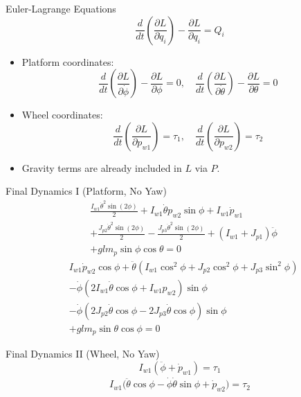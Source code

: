 \begin{frame}{Euler-Lagrange Equations}
    \small
    \[
    \frac{d}{dt}\left(\frac{\partial L}{\partial \dot q_i}\right)-\frac{\partial L}{\partial q_i}=Q_i
    \]
    \begin{itemize}
        \item Platform coordinates:
        \[
        \frac{d}{dt}\left(\frac{\partial L}{\partial \dot\phi}\right)-\frac{\partial L}{\partial \phi}=0,\quad
        \frac{d}{dt}\left(\frac{\partial L}{\partial \dot\theta}\right)-\frac{\partial L}{\partial \theta}=0
        \]
        \item Wheel coordinates:
        \[
        \frac{d}{dt}\left(\frac{\partial L}{\partial p_{w1}}\right)=\tau_1,\quad
        \frac{d}{dt}\left(\frac{\partial L}{\partial p_{w2}}\right)=\tau_2
        \]
        \item Gravity terms are already included in $L$ via $P$.
    \end{itemize}
\end{frame}

\begin{frame}{Final Dynamics I (Platform, No Yaw)}
    \footnotesize
    \[
    \begin{aligned}
    &\frac{I_{w1}\dot{\theta}^{2}\sin(2\phi)}{2}
    +I_{w1}\dot{\theta}p_{w2}\sin\phi
    +I_{w1}\dot p_{w1}\\
    &+\frac{J_{p2}\dot{\theta}^{2}\sin(2\phi)}{2}
    -\frac{J_{p3}\dot{\theta}^{2}\sin(2\phi)}{2}
    +(I_{w1}+J_{p1})\ddot\phi\\
    &+glm_p\sin\phi\cos\theta=0
    \end{aligned}
    \]
    \[
    \begin{aligned}
    &I_{w1}\dot p_{w2}\cos\phi
    +\ddot\theta\!\left(I_{w1}\cos^2\phi+J_{p2}\cos^2\phi+J_{p3}\sin^2\phi\right)\\
    &-\dot\phi\!\left(2I_{w1}\dot\theta\cos\phi+I_{w1}p_{w2}\right)\sin\phi\\
    &-\dot\phi\!\left(2J_{p2}\dot\theta\cos\phi-2J_{p3}\dot\theta\cos\phi\right)\sin\phi\\
    &+glm_p\sin\theta\cos\phi=0
    \end{aligned}
    \]
\end{frame}

\begin{frame}{Final Dynamics II (Wheel, No Yaw)}
    \footnotesize
    \[
    I_{w1}\left(\ddot\phi+\dot p_{w1}\right)=\tau_1
    \]
    \[
    \begin{aligned}
    I_{w1}\bigl(\ddot\theta\cos\phi-\dot\phi\dot\theta\sin\phi+\dot p_{w2}\bigr)=\tau_2
    \end{aligned}
    \]
\end{frame}
